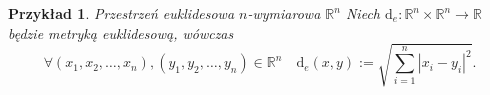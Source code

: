 \documentclass[12pt,a4paper]{report}
\newtheorem{definition}[theorem]{Definicja}
\newtheorem{example}{Przykład}
\begin{document}
\begin{example}{Przestrzeń euklidesowa $n$-wymiarowa $\mathbb{R}^n$}
Niech $\mathrm{d}_e: \mathbb{R}^n \times \mathbb{R}^n \rightarrow \mathbb{R}$ będzie metryką euklidesową, wówczas
$$\forall{(x_1,x_2,\ldots,x_n),(y_1,y_2,\ldots,y_n) \in \mathbb{R}^n} \quad \mathrm{d}_e(x,y):= \sqrt{\sum_{i=1}^{n} |x_i-y_i|^2}.$$
\end{example}


%
%
%
%
\end{document}
